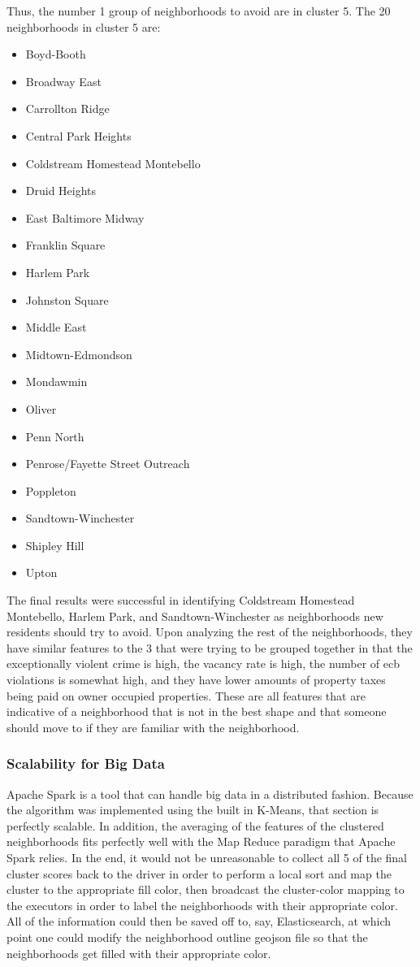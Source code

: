 \documentclass[conference]{IEEEtran}
\begin{document}
Thus, the number 1 group of neighborhoods to avoid are in cluster 5.  The 20 neighborhoods in cluster 5 are:
\begin{itemize}
	\item Boyd-Booth
	\item Broadway East
    \item Carrollton Ridge
    \item Central Park Heights
    \item Coldstream Homestead Montebello
    \item Druid Heights
    \item East Baltimore Midway
    \item Franklin Square
    \item Harlem Park
    \item Johnston Square
    \item Middle East
    \item Midtown-Edmondson
    \item Mondawmin
    \item Oliver
    \item Penn North
    \item Penrose/Fayette Street Outreach
    \item Poppleton
    \item Sandtown-Winchester
    \item Shipley Hill
    \item Upton
\end{itemize}

The final results were successful in identifying Coldstream Homestead Montebello, Harlem Park, and Sandtown-Winchester as
neighborhoods new residents should try to avoid.
Upon analyzing the rest of the neighborhoods, they have similar features to the 3 that were trying to be grouped together
in that the exceptionally violent crime is high, the vacancy rate is high, the number of ecb violations is somewhat high,
and they have lower amounts of property taxes being paid on
owner occupied properties.  These are all features that are indicative of a neighborhood that is not in the best shape and
that someone should move to if they are familiar with the neighborhood.


\subsubsection{Scalability for Big Data}
Apache Spark is a tool that can handle big data in a distributed fashion.  Because the algorithm was implemented using
the built in K-Means, that section is perfectly scalable.  In addition, the averaging of the features of the clustered neighborhoods
fits perfectly well with the Map Reduce paradigm that Apache Spark relies.  In the end, it would not be unreasonable
to collect all 5 of the final cluster scores back to the driver in order to perform a local sort and map the cluster to
the appropriate fill color, then broadcast the cluster-color mapping to the executors in order to label the neighborhoods
with their appropriate color.  All of the information could then be saved off to, say, Elasticsearch, at which point one
could modify the neighborhood outline geojson file so that the neighborhoods get filled with their appropriate color.
\end{document}
